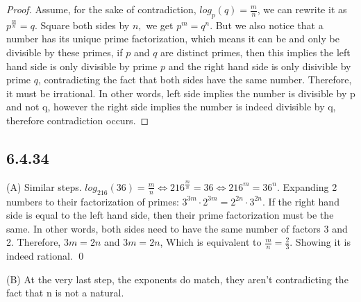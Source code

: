 \documentclass{article}
\begin{document}
\begin{proof}
   Assume, for the sake of contradiction,  $log_p(q)=\frac{m}n$, we can rewrite it as $p^{\frac{m}n}=q.$ Square both sides by $n,$ we get $p^m=q^n.$  But we also notice that a number has its unique prime factorization, which means it can be and only be divisible by these primes, if $p$ and $q$ are distinct primes, then this implies the left hand side is only divisible by prime $p$ and the right hand side is only disivible by prime $q$, contradicting the fact that both sides have the same number. Therefore, it must be irrational. In other words, left side implies the number is divisible by p and not q, however the right side implies the number is indeed divisible by q, therefore contradiction occurs. 
\end{proof}

\subsection*{6.4.34}
(A) Similar steps. $log_{216}(36)=\frac{m}n \iff 216^{\frac{m}n}=36 \iff 216^m=36^n.$ Expanding 2 numbers to their factorization of primes: $3^{3m}\cdot2^{3m}=2^{2n}\cdot3^{2n}.$ If the right hand side is equal to the left hand side, then their prime factorization must be the same. In other words, both sides need to have the same number of factors 3 and 2. Therefore, $3m=2n$ and $3m=2n$, Which is equivalent to $\frac{m}n=\frac23.$ Showing it is indeed rational. \qed

(B) At the very last step, the exponents do match, they aren't contradicting the fact that n is not a natural. 
 
\end{document}
